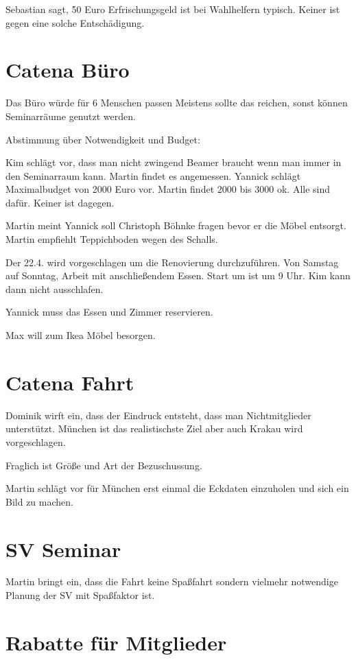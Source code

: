\documentclass[a4paper, 11pt]{article}
\begin{document}
Sebastian sagt, 50 Euro Erfrischungsgeld ist bei Wahlhelfern typisch.
Keiner ist gegen eine solche Entschädigung.

\section*{Catena Büro}

Das Büro würde für 6 Menschen passen
Meistens sollte das reichen, sonst können Seminarräume genutzt werden.

Abstimmung über Notwendigkeit und Budget:

Kim schlägt vor, dass man nicht zwingend Beamer braucht wenn man immer in den Seminarraum kann.
Martin findet es angemessen.
Yannick schlägt Maximalbudget von 2000 Euro vor. Martin findet 2000 bis 3000 ok.
Alle sind dafür. Keiner ist dagegen.

Martin meint Yannick soll Christoph Böhnke fragen bevor er die Möbel entsorgt.
Martin empfiehlt Teppichboden wegen des Schalls.

Der 22.4. wird vorgeschlagen um die Renovierung durchzuführen.
Von Samstag auf Sonntag, Arbeit mit anschließendem Essen.
Start um ist um 9 Uhr. Kim kann dann nicht ausschlafen.

Yannick muss das Essen und Zimmer reservieren.

Max will zum Ikea Möbel besorgen.

\section*{Catena Fahrt}

Dominik wirft ein, dass der Eindruck entsteht, dass man Nichtmitglieder unterstützt.
München ist das realistischste Ziel aber auch Krakau wird vorgeschlagen.

Fraglich ist Größe und Art der Bezuschussung.

Martin schlägt vor für München erst einmal die Eckdaten einzuholen und sich ein Bild zu machen.

\section*{SV Seminar}

Martin bringt ein, dass die Fahrt keine Spaßfahrt sondern vielmehr notwendige Planung der SV mit Spaßfaktor ist.

\section*{Rabatte für Mitglieder}
\end{document}
